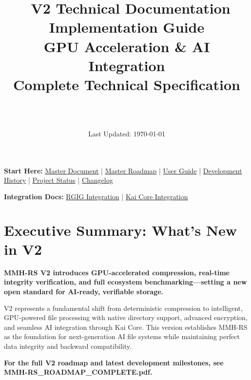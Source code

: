 \documentclass[12pt,a4paper]{article}
\title{\Huge\textbf{\project\ V2 Technical Documentation}\\[0.5cm]
\Large\textbf{Implementation Guide}\\[0.3cm]
\large GPU Acceleration \& AI Integration\\[0.5cm]
\large Complete Technical Specification}
\author{\Large\authorname\\[0.2cm]\email\\[0.2cm]\github}
\date{\large Last Updated: \today}
\begin{document}
\maketitle
\thispagestyle{empty}

\begin{tcolorbox}[colback=blue!10,colframe=blue!50,title=\textbf{Full Documentation Suite}]
\textbf{Start Here:} \href{MMH-RS_MASTER_DOCUMENT.pdf}{Master Document} | \href{MMH-RS_ROADMAP_COMPLETE.pdf}{Master Roadmap} | \href{USER_GUIDE.md}{User Guide} | \href{DEVELOPMENT_HISTORY.md}{Development History} | \href{PROJECT_STATUS.md}{Project Status} | \href{CHANGELOG.md}{Changelog}

\textbf{Integration Docs:} \href{RGIG_INTEGRATION_COMPLETE.pdf}{RGIG Integration} | \href{KAI_CORE_INTEGRATION_COMPLETE.pdf}{Kai Core Integration}
\end{tcolorbox}

\tableofcontents
\newpage

\section{Executive Summary: What's New in V2}

\begin{tcolorbox}[colback=v2blue!10,colframe=v2blue!50,title=\textbf{MMH-RS V2 Technical Summary}]
\textbf{MMH-RS V2 introduces GPU-accelerated compression, real-time integrity verification, and full ecosystem benchmarking—setting a new open standard for AI-ready, verifiable storage.}

V2 represents a fundamental shift from deterministic compression to intelligent, GPU-powered file processing with native directory support, advanced encryption, and seamless AI integration through Kai Core. This version establishes MMH-RS as the foundation for next-generation AI file systems while maintaining perfect data integrity and backward compatibility.
\end{tcolorbox}

\textbf{For the full V2 roadmap and latest development milestones, see MMH-RS\_ROADMAP\_COMPLETE.pdf.}
\end{document}
